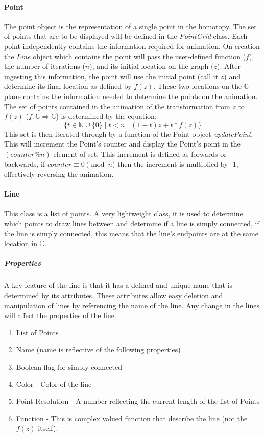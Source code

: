 \documentclass{article}
\begin{document}
            \paragraph{Point}
            The point object is the representation of a  single point in the homotopy. The set of points that are to be displayed will be defined in the \textit{PointGrid} class. Each point independently contains the information required for animation. On creation the \textit{Line} object which contains the point will pass the user-defined function ($f$), the number of iterations ($n$), and its initial location on the graph ($z$). After ingesting this information, the point will use the initial point (call it $z$) and determine its final location as defined by $f(z)$. These two locations on the $\mathbb{C}$-plane contains the information needed to determine the points on the animation. The set of points contained in the animation of the transformation from $z$  to $f(z)$ ($f:\mathbb{C} \Rightarrow \mathbb{C}$) is determined by the equation:
            $$\{t \in \mathbb{N} \cup\{0\} \mid t < n \mid (1-t)z+t*f(z)\}$$
            This set is then iterated through by a function of the Point object \textit{updatePoint}. This will increment the Point's counter and display the Point's point in the $(counter\%n)$ element of set. This increment is defined as forwards or backwards, if $counter \equiv 0 \pmod n$ then the increment is multiplied by -1, effectively reversing the animation.
            
            \paragraph{Line}
            This class is a list of points. A very lightweight class, it is used to determine which points to draw lines between and determine if a line is simply connected, if the line is simply connected, this means that the line's endpoints are at the same location in $\mathbb{C}$.
                \subparagraph{Properties}
                A key feature of the line is that it has a defined and unique name that is determined by its attributes. These attributes allow easy deletion and manipulation of lines by referencing the name of the line. Any change in the lines will affect the properties of the line.
                \begin{enumerate}
                    \item List of Points
                    \item Name (name is reflective of the following properties)
                    \item Boolean flag for simply connected
                    \item Color - Color of the line
                    \item Point Resolution - A number reflecting the current length of the list of Points
                    \item Function - This is complex valued function that describe the line (not the $f(z)$ itself).
                \end{enumerate}
            
\end{document}
